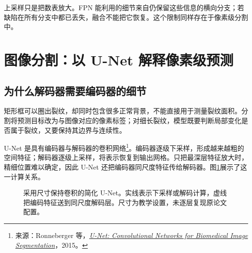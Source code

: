 上采样只是把数表放大。FPN 能利用的细节来自仍保留这些信息的横向分支；若缺陷在所有分支中都已丢失，融合不能把它恢复。这个限制同样存在于像素级分割中。

\section{图像分割：以 U-Net 解释像素级预测}
\subsection{为什么解码器需要编码器的细节}
矩形框可以圈出裂纹，却同时包含很多正常背景，不能直接用于测量裂纹面积。分割将预测目标改为与图像对应的像素标签；对细长裂纹，模型既要判断局部变化是否属于裂纹，又要保持其边界与连续性。

U-Net 是具有编码器与解码器的卷积网络\footnote{来源：Ronneberger 等，\href{https://arxiv.org/abs/1505.04597}{\textit{U-Net: Convolutional Networks for Biomedical Image Segmentation}}，2015。}。编码器逐级下采样，形成越来越粗的空间特征；解码器逐级上采样，将表示恢复到输出网格。只把最深层特征放大时，精细位置难以确定，因此 U-Net 还把编码器同尺度特征传给解码器。图\ref{fig:vision-unet}展示了这一计算关系。

\begin{figure}[htbp]
\centering
{}
\caption{采用尺寸保持卷积的简化 U-Net。实线表示下采样或解码计算，虚线把编码特征送到同尺度解码层。尺寸为教学设置，未逐层复现原论文配置。}
\label{fig:vision-unet}
\end{figure}

